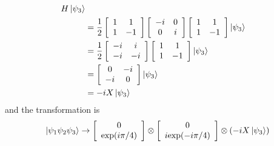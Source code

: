 \documentclass[a4paper,12pt]{article}
\begin{document}
\begin{enumerate}
\begin{align*}
            H \ket{\psi_3} \\
            &= \frac{1}{2}
            \left[ \begin{array}{cc}
                    1 & 1 \\
                    1 & -1
            \end{array} \right]
            \left[ \begin{array}{cc}
                    -i & 0 \\
                    0 & i
            \end{array} \right]
            \left[ \begin{array}{cc}
                    1 & 1 \\
                    1 & -1
            \end{array} \right]
            \ket{\psi_3} \\
            &= \frac{1}{2}
            \left[ \begin{array}{cc}
                    -i & i \\
                    -i & -i
            \end{array} \right]
            \left[ \begin{array}{cc}
                    1 & 1 \\
                    1 & -1
            \end{array} \right]
            \ket{\psi_3} \\
            &= \left[ \begin{array}{cc}
                    0 & -i \\
                    -i & 0
            \end{array} \right]
            \ket{\psi_3} \\
            &= -iX\ket{\psi_3}
        \end{align*}
        and the transformation is
        \begin{align*}
            \ket{\psi_1 \psi_2 \psi_3} &\rightarrow
            \left[ \begin{array}{cc}
                0 \\
                \mbox{exp}(i \pi / 4)
            \end{array} \right]
            \otimes
            \left[ \begin{array}{c}
                    0 \\
                    i \mbox{exp}(-i \pi / 4)
            \end{array} \right]
            \otimes
            (-iX\ket{\psi_3}) \\

\end{align*}
\end{enumerate}
\end{document}
